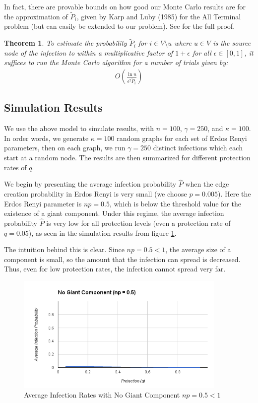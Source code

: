 \documentclass{article}
\theoremstyle{plain}
\newtheorem{theorem}{Theorem}
\begin{document}
In fact, there are provable bounds on how good our Monte Carlo results are for the approximation of $\tilde{P}_i$, given by Karp and Luby (1985) for the All Terminal problem (but can easily be extended to our problem). See \cite{karp-luby85} for the full proof.

\begin{theorem}
  To estimate the probability $\tilde{P}_i$ for $i \in V \setminus u$ where $u \in V$ is the source node of the infection to within a multiplicative factor of $1 + \epsilon$ for all $\epsilon \in [0,1]$, it suffices to run the Monte Carlo algorithm for a number of trials given by:
  \begin{eqnarray}
    O \left( \frac{\ln n}{\epsilon^2 \tilde{P}_i} \right)
  \end{eqnarray}
\end{theorem}

\subsection{Simulation Results}

We use the above model to simulate results, with $n = 100$, $\gamma = 250$, and $\kappa = 100$. In order words, we generate $\kappa = 100$ random graphs for each set of Erdos Renyi parameters, then on each graph, we run $\gamma = 250$ distinct infections which each start at a random node. The results are then summarized for different protection rates of $q$.

We begin by presenting the average infection probability $\hat{P}$ when the edge creation probability in Erdos Renyi is very small (we choose $p = 0.005$). Here the Erdos Renyi parameter is $np = 0.5$, which is below the threshold value for the existence of a giant component. Under this regime, the average infection probability $\hat{P}$ is very low for all protection levels (even a protection rate of $q = 0.05$), as seen in the simulation results from figure \ref{avg_prob_np05.fig}.

The intuition behind this is clear. Since $np = 0.5 < 1$, the average size of a component is small, so the amount that the infection can spread is decreased. Thus, even for low protection rates, the infection cannot spread very far.

\begin{figure}[h!]
  \centering
  \includegraphics[width=4in]{avg_prob_np05.png}
  \caption{Average Infection Rates with No Giant Component $np = 0.5 < 1$}
  \label{avg_prob_np05.fig}
\end{figure}
\end{document}
